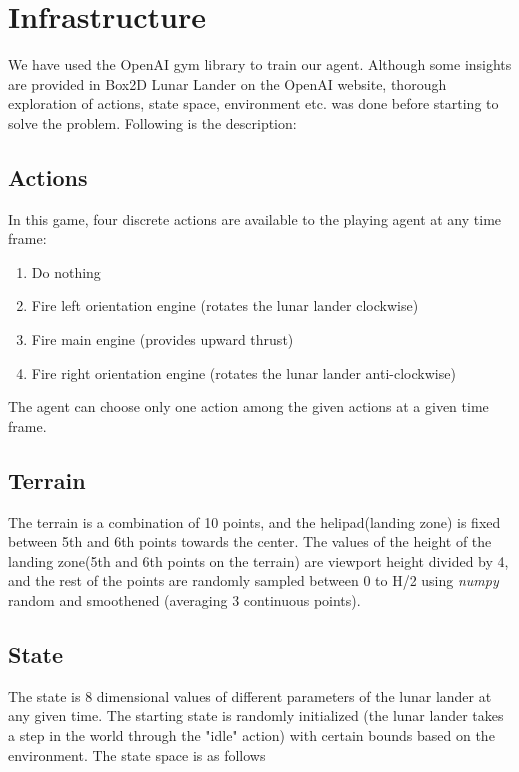\section{Infrastructure}



We have used the OpenAI gym \citep{openai} library to train our agent. Although some insights are provided in Box2D Lunar Lander on the OpenAI website, thorough exploration of actions, state space, environment etc. was done before starting to solve the problem. Following is the description:

\subsection{Actions}
In this game, four discrete actions are available to the playing agent at any time frame: 

\begin{enumerate}[label=(\alph*)]
\item  Do nothing 
\item  Fire left orientation engine (rotates the lunar lander clockwise)
\item Fire main engine (provides upward thrust) 
\item Fire right orientation engine (rotates the lunar lander anti-clockwise) 
\end{enumerate}

The agent can choose only one action among the given actions at a given time frame.

\subsection{Terrain} 
The terrain is a combination of 10 points, and the helipad(landing zone) is fixed between 5th and 6th points towards the center. The values of the height of the landing zone(5th and 6th points on the terrain) are viewport height divided by 4, and the rest of the points are randomly sampled between 0 to H/2 using \textit{numpy} random and smoothened (averaging 3 continuous points).

\subsection{ State}

The state is 8 dimensional values of different parameters of the lunar lander at any given time. The starting state is randomly initialized (the lunar lander takes a step in the world through the "idle" action) with certain bounds based on the environment. The state space is as follows

